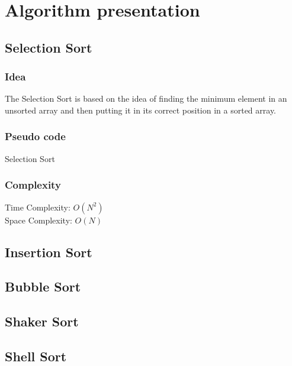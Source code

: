 \documentclass[11pt,a4paper]{article}
\newcommand\tab[1][1cm]{\hspace*{#1}}
\begin{document}
\section{Algorithm presentation}
\subsection{Selection Sort}

\subsubsection*{Idea}
\tab The Selection Sort is based on the idea of finding the minimum element in an unsorted array and then putting it in its correct position in a sorted array.

\subsubsection*{Pseudo code}
\begin{algorithm2e}
  \SetAlgoLined
  \caption{Selection Sort}
\end{algorithm2e}

\subsubsection*{Complexity}
Time Complexity: $O(N^2)$ \\
Space Complexity: $O(N)$

\subsection{Insertion Sort}

\subsection{Bubble Sort}
\subsection{Shaker Sort}
\subsection{Shell Sort}
\end{document}
